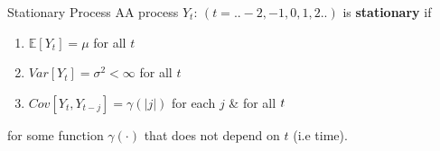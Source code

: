 \documentclass[openany]{tufte-book} %
\begin{document}
\begin{mydef}{\hspace{3pt}Stationary Process} AA process $Y_t$: $(t=..-2,-1,0,1,2..)$ is \textbf{stationary} if

\begin{enumerate}
\item $\mathbb{E}\left[ Y_{t}\right] =\mu $  for all $t$\medskip

\item $Var\left[ Y_{t}\right] =\sigma^2<\infty$  for all $t$
\medskip

\item $Cov\left[ Y_{t},Y_{t-j}\right]=\gamma(|j|) $ for each $j$  \&
for all $t\medskip $
\end{enumerate}
for some function $\gamma(\cdot)$ that does not depend on $t$ (i.e time).\end{mydef} 
\end{document}

